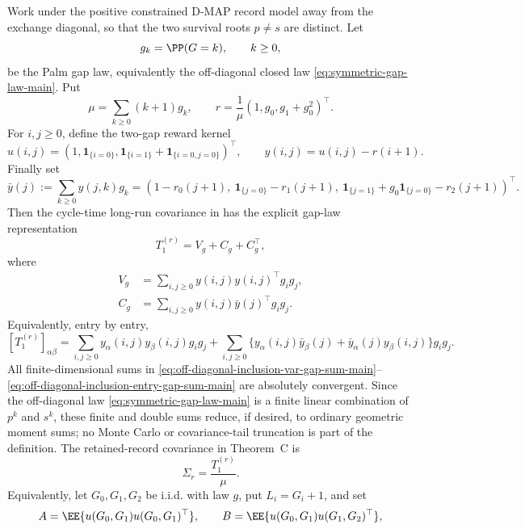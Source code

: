 \begin{lemma}\label{lem:off-diagonal-inclusion-covariance-gap-sums-main}
Work under the positive constrained D-MAP record model away from the exchange
diagonal, so that the two survival roots \(p\ne s\) are distinct.  Let
\[
g_k=\PP(G=k),\qquad k\ge0,
\]
be the Palm gap law, equivalently the off-diagonal closed law
\eqref{eq:symmetric-gap-law-main}.  Put
\[
\mu=\sum_{k\ge0}(k+1)g_k,\qquad
r=\frac1\mu(1,g_0,g_1+g_0^2)^\top .
\]
For \(i,j\ge0\), define the two-gap reward kernel
\[
u(i,j)=
\left(1,\mathbf1_{\{i=0\}},
\mathbf1_{\{i=1\}}+\mathbf1_{\{i=0,j=0\}}\right)^\top,
\qquad
y(i,j)=u(i,j)-r(i+1).
\]
Finally set
\[
\bar y(j):=\sum_{k\ge0}y(j,k)g_k
=
\left(
1-r_0(j+1),\
\mathbf1_{\{j=0\}}-r_1(j+1),\
\mathbf1_{\{j=1\}}+g_0\mathbf1_{\{j=0\}}-r_2(j+1)
\right)^\top .
\]
Then the cycle-time long-run covariance in
 has the explicit
gap-law representation
\begin{equation}\label{eq:off-diagonal-inclusion-covariance-gap-sums-main}
T_1^{(r)}=V_g+C_g+C_g^\top ,
\end{equation}
where
\begin{align}
V_g&=\sum_{i,j\ge0} y(i,j)y(i,j)^\top g_i g_j,
\label{eq:off-diagonal-inclusion-var-gap-sum-main}\\
C_g&=\sum_{i,j\ge0} y(i,j)\bar y(j)^\top g_i g_j .
\label{eq:off-diagonal-inclusion-adjacent-gap-sum-main}
\end{align}
Equivalently, entry by entry,
\begin{equation}\label{eq:off-diagonal-inclusion-entry-gap-sum-main}
[T_1^{(r)}]_{\alpha\beta}
=\sum_{i,j\ge0}y_\alpha(i,j)y_\beta(i,j)g_i g_j
+\sum_{i,j\ge0}
\{y_\alpha(i,j)\bar y_\beta(j)+\bar y_\alpha(j)y_\beta(i,j)\}g_i g_j .
\end{equation}
All finite-dimensional sums in
\eqref{eq:off-diagonal-inclusion-var-gap-sum-main}--\eqref{eq:off-diagonal-inclusion-entry-gap-sum-main}
are absolutely convergent.  Since the off-diagonal law
\eqref{eq:symmetric-gap-law-main} is a finite linear combination of
\(p^k\) and \(s^k\), these finite and double sums reduce, if desired, to
ordinary geometric moment sums; no Monte Carlo or covariance-tail truncation is
part of the definition.  The retained-record covariance in Theorem~C is
\[
\Sigma_r=\frac{T_1^{(r)}}{\mu}.
\]
Equivalently, let \(G_0,G_1,G_2\) be i.i.d. with law \(g\), put
\(L_i=G_i+1\), and set
\[
A=\EE\{u(G_0,G_1)u(G_0,G_1)^\top\},\qquad
B=\EE\{u(G_0,G_1)u(G_1,G_2)^\top\},
\]
\end{lemma}
